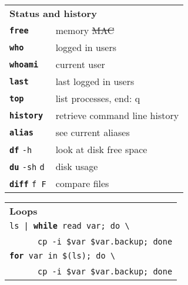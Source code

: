 \documentclass[a4paper,10pt,landscape]{report}
\newcommand{\boxtitle}[1]{{\textbf{\color{RubineRed}#1}}}
\newcommand{\example}[1]{{\texttt{\color{RubineRed}#1}}}
\newcommand{\labbr}[1]{{\texttt{\color{Red}#1}}}
\newcommand{\rabbr}[1]{{\color{Red}#1}}
\newcommand{\co}[1]{\texttt{#1}}
\newcommand{\cob}[1]{\texttt{\textbf{#1}}} %
\begin{document}
\begin{multicols}{4}
\begin{mdframed}[style=mybox]
\begin{tabular}{ l l }
\multicolumn{2}{l}{\boxtitle{Status and history}} \\
\cob{free}                & memory \rabbr{\sout{MAC}} \\
\cob{who}                 & logged in users\\
\cob{whoami}              & current user\\
\cob{last}                & last logged in users\\
\cob{top}                 & list processes, end: q \\
\cob{history}             & retrieve command line history \\
\cob{alias}               & see current aliases \\
\cob{df} \co{-h}          & look at disk free space \\
\cob{du} \co{-sh} \labbr{d}  & disk usage \\
\cob{diff} \labbr{f F}       & compare files \\
\end{tabular}
\end{mdframed}

\begin{mdframed}[style=mybox]
\begin{tabular}{ l }
\multicolumn{1}{l}{\boxtitle{Loops}} \\
\example{ls | \cob{while} read var; do \textbackslash{}} \\
~~~~~~\example{cp -i \$var \$var.backup; done} \\
\example{\cob{for} var in \$(ls); do \textbackslash{}} \\
~~~~~~\example{cp -i \$var \$var.backup; done} \\
\end{tabular}
\end{mdframed}


\end{multicols}
\end{document}
